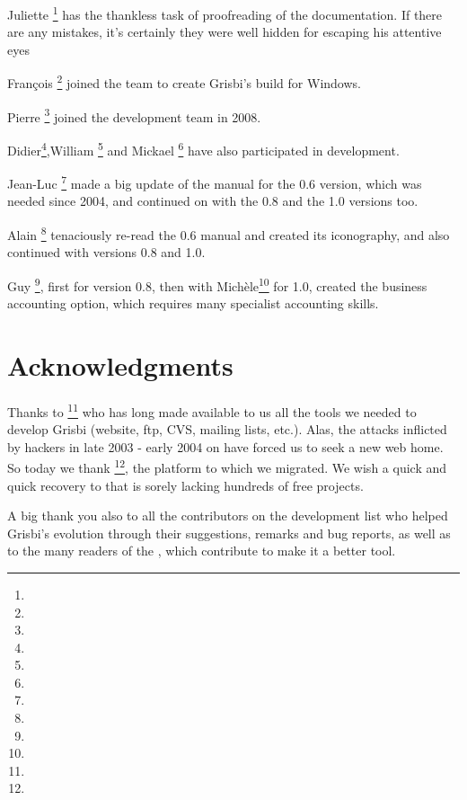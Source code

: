 {Juliette }\footnote{\urlJulietteEmail{}} has the thankless task of proofreading of the documentation. If there are any mistakes, it's certainly they were well hidden for escaping his attentive eyes

{François }\footnote{\urlFrancoisTerrotEmail{}} joined the team to create Grisbi's \gls{build} for Windows.

{Pierre }\footnote{\urlPierreBiavaEmail{}} joined the development team in 2008.

{Didier}\footnote{\urlDidierChevalierEmail{}},{William }\footnote{\urlWilliamOllivierEmail{}} and {Mickael }\footnote{\urlMickaelRemarsEmail{}} have also participated in development.

{Jean-Luc }\footnote{\urlJeanLucDuflotEmail{}} made a big update of the manual for the 0.6 version, which was needed since 2004, and continued on with the 0.8 and the 1.0 versions too.

{Alain }\footnote{\urlAlainLetientEmail{}} tenaciously re-read the 0.6 manual and created its iconography, and also continued with versions 0.8 and 1.0.

{Guy }\footnote{\urlGuyLebegueEmail{}}, first for version 0.8, then with {Michèle}\footnote{\urlMicheleBondilEmail{}} for 1.0, created the business accounting option, which requires many specialist accounting skills.

\section{Acknowledgments \label{introduction-thanks}}

Thanks to \footnote{\urlTuxFamily{}} who has long made available to us all the tools we needed to develop Grisbi 
(website, ftp, CVS, mailing lists, etc.). Alas, the attacks inflicted by hackers in late 2003 - early 2004 on  have forced us to seek a new web home. So today we thank \footnote{\urlSourceForge{}}, the platform to which we migrated.  We wish a quick and quick recovery to  that is sorely lacking hundreds of free projects.

A big thank you also to all the contributors on the development list who helped Grisbi's evolution through their suggestions, remarks and bug reports, as well as to the many readers of the , which contribute to make it a better tool.

